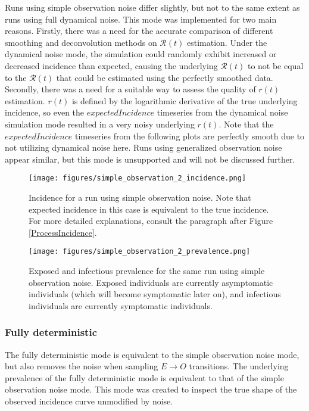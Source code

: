 \documentclass{article}
\newcommand{\nR}{\mathcal{R}}
\begin{document}
Runs using simple observation noise differ slightly, but not to the same extent as runs using full dynamical noise. This mode was implemented for two main reasons. Firstly, there was a need for the accurate comparison of different smoothing and deconvolution methods on $\nR(t)$ estimation. Under the dynamical noise mode, the simulation could randomly exhibit increased or decreased incidence than expected, causing the underlying $\nR(t)$ to not be equal to the $\nR(t)$ that could be estimated using the perfectly smoothed data. Secondly, there was a need for a suitable way to assess the quality of $r(t)$ estimation. $r(t)$ is defined by the logarithmic derivative of the true underlying incidence, so even the $expectedIncidence$ timeseries from the dynamical noise simulation mode resulted in a very noisy underlying $r(t)$. Note that the $expectedIncidence$ timeseries from the following plots are perfectly smooth due to not utilizing dynamical noise here. Runs using generalized observation noise appear similar, but this mode is unsupported and will not be discussed further.

\begin{figure}[h!]
    \centering
    \texttt{[image: figures/simple\_observation\_2\_incidence.png]}
    \caption{Incidence for a run using simple observation noise. Note that expected incidence in this case is equivalent to the true incidence. For more detailed explanations, consult the paragraph after Figure \ref{ProcessIncidence}.}
\end{figure}

\clearpage
\begin{figure}[h!]
    \centering
    \texttt{[image: figures/simple\_observation\_2\_prevalence.png]}
    \caption{Exposed and infectious prevalence for the same run using simple observation noise. Exposed individuals are currently asymptomatic individuals (which will become symptomatic later on), and infectious individuals are currently symptomatic individuals.}
\end{figure}

\subsubsection{Fully deterministic}
The fully deterministic mode is equivalent to the simple observation noise mode, but also removes the noise when sampling $E \rightarrow O$ transitions. The underlying prevalence of the fully deterministic mode is equivalent to that of the simple observation noise mode. This mode was created to inspect the true shape of the observed incidence curve unmodified by noise. 
\end{document}
